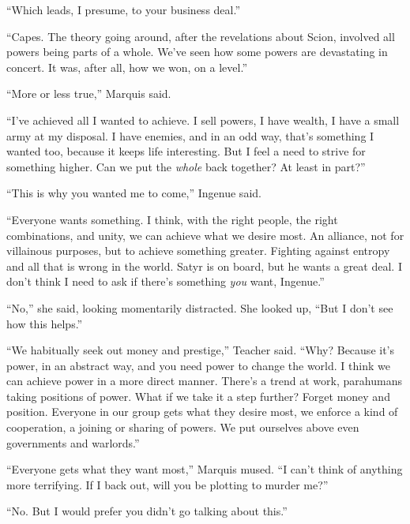 ``Which leads, I presume, to your business deal.''



``Capes.  The theory going around, after the revelations about Scion, involved all powers being parts of a whole.  We've seen how some powers are devastating in concert.  It was, after all, how we won, on a level.''



``More or less true,'' Marquis said.



``I've achieved all I wanted to achieve.  I sell powers, I have wealth, I have a small army at my disposal.  I have enemies, and in an odd way, that's something I wanted too, because it keeps life interesting.  But I feel a need to strive for something higher.  Can we put the \emph{whole }back together?  At least in part?''



``This is why you wanted me to come,'' Ingenue said.



``Everyone wants something.  I think, with the right people, the right combinations, and unity, we can achieve what we desire most.  An alliance, not for villainous purposes, but to achieve something greater.  Fighting against entropy and all that is wrong in the world.  Satyr is on board, but he wants a great deal.  I don't think I need to ask if there's something \emph{you} want, Ingenue.''



``No,'' she said, looking momentarily distracted.  She looked up, ``But I don't see how this helps.''



``We habitually seek out money and prestige,'' Teacher said.  ``Why?  Because it's power, in an abstract way, and you need power to change the world.  I think we can achieve power in a more direct manner.  There's a trend at work, parahumans taking positions of power.  What if we take it a step further?  Forget money and position.  Everyone in our group gets what they desire most, we enforce a kind of cooperation, a joining or sharing of powers.  We put ourselves above even governments and warlords.''



``Everyone gets what they want most,'' Marquis mused.  ``I can't think of anything more terrifying.  If I back out, will you be plotting to murder me?''



``No.  But I would prefer you didn't go talking about this.''



